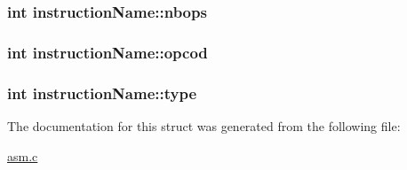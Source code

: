 \subsubsection[{\texorpdfstring{nbops}{nbops}}]{\setlength{\rightskip}{0pt plus 5cm}int instruction\+Name\+::nbops}\hypertarget{structinstructionName_aecc3848e91d527de92cea2cd25c652d4}{}\label{structinstructionName_aecc3848e91d527de92cea2cd25c652d4}
\subsubsection[{\texorpdfstring{opcod}{opcod}}]{\setlength{\rightskip}{0pt plus 5cm}int instruction\+Name\+::opcod}\hypertarget{structinstructionName_a56fd802379b5c3d00a83cf4915b14de7}{}\label{structinstructionName_a56fd802379b5c3d00a83cf4915b14de7}
\subsubsection[{\texorpdfstring{type}{type}}]{\setlength{\rightskip}{0pt plus 5cm}int instruction\+Name\+::type}\hypertarget{structinstructionName_a343ced7f4083a1a399a5195b5c6bc8a8}{}\label{structinstructionName_a343ced7f4083a1a399a5195b5c6bc8a8}


The documentation for this struct was generated from the following file\+:\begin{DoxyCompactItemize}
\item 
\hyperlink{asm_8c}{asm.\+c}\end{DoxyCompactItemize}
